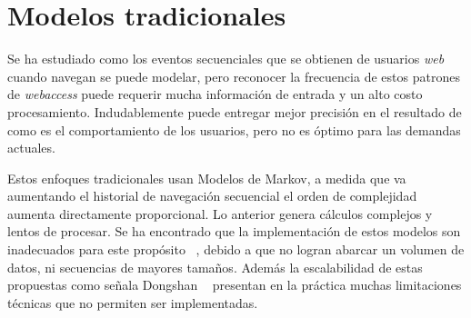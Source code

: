\section{Modelos tradicionales}

%
 

Se ha estudiado como los eventos secuenciales que se obtienen de usuarios \emph{web} cuando navegan se puede modelar, pero reconocer la frecuencia de estos patrones de \emph{webaccess} puede requerir mucha  información de entrada y un alto costo procesamiento.  Indudablemente puede entregar mejor precisión en el resultado de como es el comportamiento de los usuarios, pero no es óptimo para las demandas actuales. 

Estos enfoques tradicionales usan Modelos de Markov, a medida que va aumentando el historial de navegación secuencial el orden de complejidad aumenta directamente proporcional. Lo anterior genera cálculos  complejos y lentos de procesar. Se ha encontrado que la implementación de estos modelos son inadecuados para este propósito~\cite{Dongshan2002} , debido a que no logran abarcar un volumen de datos, ni secuencias de mayores tamaños. Además la escalabilidad de estas propuestas  como señala Dongshan \etal~\cite{Dongshan2002} presentan en la práctica muchas limitaciones técnicas que no permiten ser implementadas. 


 





